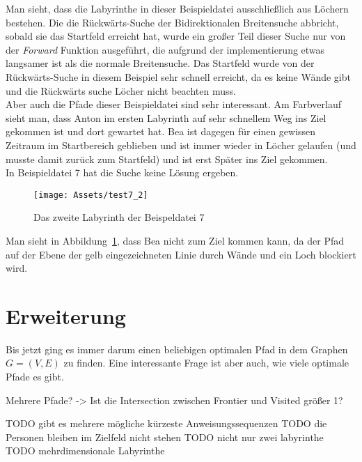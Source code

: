 \documentclass[a4paper,10pt,ngerman]{scrartcl}
\begin{document}
    Man sieht, dass die Labyrinthe in dieser Beispieldatei ausschließlich aus Löchern bestehen.
    Die die Rückwärts-Suche der Bidirektionalen Breitensuche abbricht, sobald sie das Startfeld erreicht hat, wurde ein großer Teil dieser Suche nur von der \textit{Forward} Funktion ausgeführt, die aufgrund der implementierung etwas langsamer ist als die normale Breitensuche.
    Das Startfeld wurde von der Rückwärts-Suche in diesem Beispiel sehr schnell erreicht, da es keine Wände gibt und die Rückwärts suche Löcher nicht beachten muss. \\
    Aber auch die Pfade dieser Beispieldatei sind sehr interessant.
    Am Farbverlauf sieht man, dass Anton im ersten Labyrinth auf sehr schnellem Weg ins Ziel gekommen ist und dort gewartet hat.
    Bea ist dagegen für einen gewissen Zeitraum im Startbereich geblieben und ist immer wieder in Löcher gelaufen (und musste damit zurück zum Startfeld) und ist erst Später ins Ziel gekommen. \\
    In Beispieldatei 7 hat die Suche keine Lösung ergeben.
    \begin{figure}[H]
        \label{fig:7}
        \centering
        \texttt{[image: Assets/test7\_2]}

        \caption{Das zweite Labyrinth der Beispeldatei 7}
    \end{figure}
    Man sieht in Abbildung~\ref{fig:7}, dass Bea nicht zum Ziel kommen kann, da der Pfad auf der Ebene der gelb eingezeichneten Linie durch Wände und ein Loch blockiert wird.


    \section{Erweiterung}
    Bis jetzt ging es immer darum einen beliebigen optimalen Pfad in dem Graphen $G = (V, E)$ zu finden.
    Eine interessante Frage ist aber auch, wie viele optimale Pfade es gibt.

    Mehrere Pfade? -> Ist die Intersection zwischen Frontier und Visited größer 1?


    TODO gibt es mehrere mögliche kürzeste Anweisungssequenzen
    TODO die Personen bleiben im Zielfeld nicht stehen
    TODO nicht nur zwei labyrinthe
    TODO mehrdimensionale Labyrinthe
\end{document}
